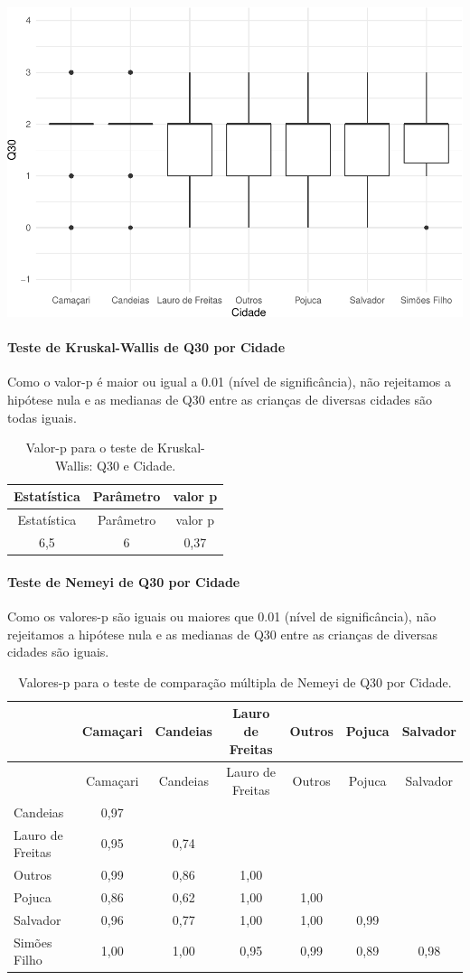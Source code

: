 \documentclass[]{article}
\let\oldparagraph\paragraph
\renewcommand{\paragraph}[1]{\oldparagraph{#1}\mbox{}}
\begin{document}
\begin{center}\includegraphics[width=0.75\linewidth]{relatorio_covid19_files/figure-latex/unnamed-chunk-962-1} \end{center}

\hypertarget{teste-de-kruskal-wallis-de-q30-por-cidade}{%
\paragraph{Teste de Kruskal-Wallis de Q30 por Cidade}\label{teste-de-kruskal-wallis-de-q30-por-cidade}}

Como o valor-p é maior ou igual a 0.01 (nível de significância), não rejeitamos a hipótese nula e as medianas de Q30 entre as crianças de diversas cidades são todas iguais.

\begin{longtable}[]{@{}ccc@{}}
\caption{\label{tab:unnamed-chunk-964}Valor-p para o teste de Kruskal-Wallis: Q30 e Cidade.}\tabularnewline
\toprule
Estatística & Parâmetro & valor p\tabularnewline
\midrule
\endfirsthead
\toprule
Estatística & Parâmetro & valor p\tabularnewline
\midrule
\endhead
6,5 & 6 & 0,37\tabularnewline
\bottomrule
\end{longtable}

\hypertarget{teste-de-nemeyi-de-q30-por-cidade}{%
\paragraph{Teste de Nemeyi de Q30 por Cidade}\label{teste-de-nemeyi-de-q30-por-cidade}}

Como os valores-p são iguais ou maiores que 0.01 (nível de significância), não rejeitamos a hipótese nula e as medianas de Q30 entre as crianças de diversas cidades são iguais.

\begin{longtable}[]{@{}lcccccc@{}}
\caption{\label{tab:unnamed-chunk-966}Valores-p para o teste de comparação múltipla de Nemeyi de Q30 por Cidade.}\tabularnewline
\toprule
& Camaçari & Candeias & Lauro de Freitas & Outros & Pojuca & Salvador\tabularnewline
\midrule
\endfirsthead
\toprule
& Camaçari & Candeias & Lauro de Freitas & Outros & Pojuca & Salvador\tabularnewline
\midrule
\endhead
Candeias & 0,97 & & & & &\tabularnewline
Lauro de Freitas & 0,95 & 0,74 & & & &\tabularnewline
Outros & 0,99 & 0,86 & 1,00 & & &\tabularnewline
Pojuca & 0,86 & 0,62 & 1,00 & 1,00 & &\tabularnewline
Salvador & 0,96 & 0,77 & 1,00 & 1,00 & 0,99 &\tabularnewline
Simões Filho & 1,00 & 1,00 & 0,95 & 0,99 & 0,89 & 0,98\tabularnewline
\bottomrule
\end{longtable}
\end{document}
